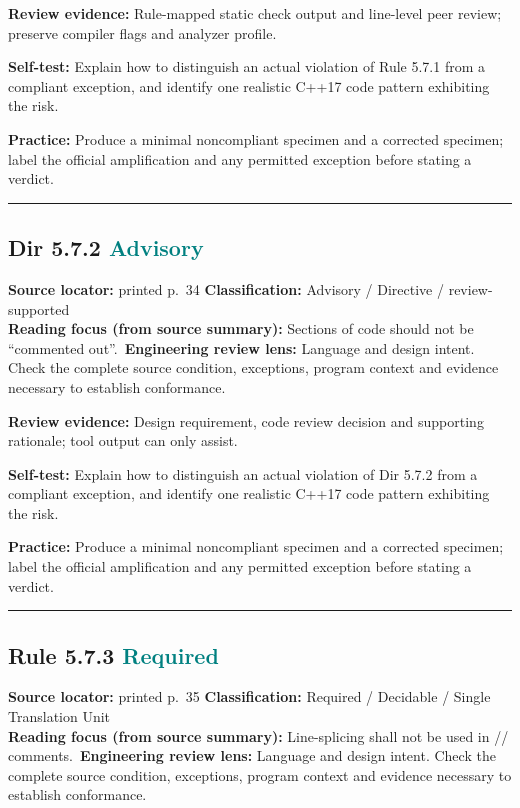 \documentclass[10pt,letterpaper]{article}
\begin{document}
\textbf{Review evidence:} Rule-mapped static check output and line-level peer review; preserve compiler flags and analyzer profile.

\textbf{Self-test:} Explain how to distinguish an actual violation of Rule 5.7.1 from a compliant exception, and identify one realistic C++17 code pattern exhibiting the risk.\par
\textbf{Practice:} Produce a minimal noncompliant specimen and a corrected specimen; label the official amplification and any permitted exception before stating a verdict.
\smallskip\hrule\smallskip
\subsection*{Dir 5.7.2 \enspace \texorpdfstring{\small\textcolor{teal}{Advisory}}{Advisory}}
\noindent\textbf{Source locator:} printed p.~34 \quad\textbf{Classification:} Advisory / Directive / review-supported\\
\textbf{Reading focus (from source summary):} Sections of code should not be ``commented out''.\
\textbf{Engineering review lens:} Language and design intent. Check the complete source condition, exceptions, program context and evidence necessary to establish conformance.

\textbf{Review evidence:} Design requirement, code review decision and supporting rationale; tool output can only assist.

\textbf{Self-test:} Explain how to distinguish an actual violation of Dir 5.7.2 from a compliant exception, and identify one realistic C++17 code pattern exhibiting the risk.\par
\textbf{Practice:} Produce a minimal noncompliant specimen and a corrected specimen; label the official amplification and any permitted exception before stating a verdict.
\smallskip\hrule\smallskip
\subsection*{Rule 5.7.3 \enspace \texorpdfstring{\small\textcolor{teal}{Required}}{Required}}
\noindent\textbf{Source locator:} printed p.~35 \quad\textbf{Classification:} Required / Decidable / Single Translation Unit\\
\textbf{Reading focus (from source summary):} Line-splicing shall not be used in // comments.\
\textbf{Engineering review lens:} Language and design intent. Check the complete source condition, exceptions, program context and evidence necessary to establish conformance.
\end{document}

